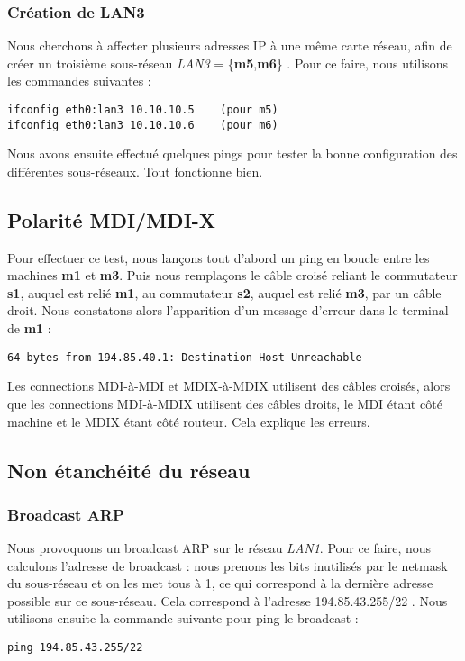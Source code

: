 \documentclass{article}
\begin{document}
\subsubsection{Création de LAN3}

Nous cherchons à affecter plusieurs adresses IP à une même carte réseau, afin de créer un troisième sous-réseau \textit{LAN3} = \{\textbf{m5},\textbf{m6}\} . Pour ce faire, nous utilisons les commandes suivantes :
\begin{verbatim}
ifconfig eth0:lan3 10.10.10.5    (pour m5)
ifconfig eth0:lan3 10.10.10.6    (pour m6)
\end{verbatim}

Nous avons ensuite effectué quelques pings pour tester la bonne configuration des différentes sous-réseaux. Tout fonctionne bien.

\subsection{Polarité MDI/MDI-X}

Pour effectuer ce test, nous lançons tout d'abord un ping en boucle entre les machines \textbf{m1} et \textbf{m3}. Puis nous remplaçons le câble croisé reliant le commutateur \textbf{s1}, auquel est relié \textbf{m1}, au commutateur \textbf{s2}, auquel est relié \textbf{m3}, par un câble droit. Nous constatons alors l'apparition d'un message d'erreur dans le terminal de \textbf{m1} :
\begin{verbatim}
64 bytes from 194.85.40.1: Destination Host Unreachable
\end{verbatim}

Les connections MDI-à-MDI et MDIX-à-MDIX utilisent des câbles croisés, alors que les connections MDI-à-MDIX utilisent des câbles droits, le MDI étant côté machine et le MDIX étant côté routeur. Cela explique les erreurs.

\newpage

\subsection{Non étanchéité du réseau}

\subsubsection{Broadcast ARP}

Nous provoquons un broadcast ARP sur le réseau \textit{LAN1}. Pour ce faire, nous calculons l'adresse de broadcast : nous prenons les bits inutilisés par le netmask du sous-réseau et on les met tous à 1, ce qui correspond à la dernière adresse possible sur ce sous-réseau. Cela correspond à l'adresse 194.85.43.255/22 . Nous utilisons ensuite la commande suivante pour ping le broadcast :
\begin{verbatim}
ping 194.85.43.255/22
\end{verbatim}
\end{document}
